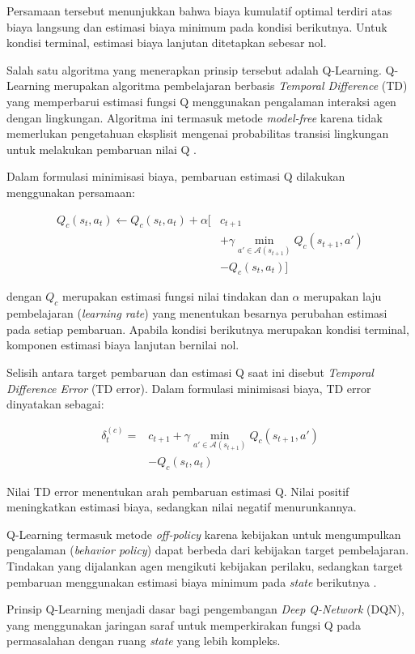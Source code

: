 Persamaan tersebut menunjukkan bahwa biaya kumulatif optimal terdiri atas biaya langsung dan estimasi biaya minimum pada kondisi berikutnya. Untuk kondisi terminal, estimasi biaya lanjutan ditetapkan sebesar nol.

Salah satu algoritma yang menerapkan prinsip tersebut adalah Q-Learning. Q-Learning merupakan algoritma pembelajaran berbasis \textit{Temporal Difference} (TD) yang memperbarui estimasi fungsi Q menggunakan pengalaman interaksi agen dengan lingkungan. Algoritma ini termasuk metode \textit{model-free} karena tidak memerlukan pengetahuan eksplisit mengenai probabilitas transisi lingkungan untuk melakukan pembaruan nilai Q \cite{watkins1992qlearning,suttonbarto2018}.

Dalam formulasi minimisasi biaya, pembaruan estimasi Q dilakukan menggunakan persamaan:

\begin{equation}
\label{eq:q_learning_cost}
\begin{aligned}
Q_c(s_t,a_t)\leftarrow Q_c(s_t,a_t)
+\alpha\bigg[
&c_{t+1}\\
&+\gamma\min_{a'\in\mathcal{A}(s_{t+1})}
Q_c(s_{t+1},a')\\
&-Q_c(s_t,a_t)
\bigg]
\end{aligned}
\end{equation}

dengan $Q_c$ merupakan estimasi fungsi nilai tindakan dan $\alpha$ merupakan laju pembelajaran (\textit{learning rate}) yang menentukan besarnya perubahan estimasi pada setiap pembaruan. Apabila kondisi berikutnya merupakan kondisi terminal, komponen estimasi biaya lanjutan bernilai nol.

Selisih antara target pembaruan dan estimasi Q saat ini disebut \textit{Temporal Difference Error} (TD error). Dalam formulasi minimisasi biaya, TD error dinyatakan sebagai:

\begin{equation}
\label{eq:td_error_cost}
\begin{aligned}
\delta_t^{(c)}
=
&c_{t+1}
+\gamma\min_{a'\in\mathcal{A}(s_{t+1})}
Q_c(s_{t+1},a')\\
&-Q_c(s_t,a_t)
\end{aligned}
\end{equation}

Nilai TD error menentukan arah pembaruan estimasi Q. Nilai positif meningkatkan estimasi biaya, sedangkan nilai negatif menurunkannya.

Q-Learning termasuk metode \textit{off-policy} karena kebijakan untuk mengumpulkan pengalaman (\textit{behavior policy}) dapat berbeda dari kebijakan target pembelajaran. Tindakan yang dijalankan agen mengikuti kebijakan perilaku, sedangkan target pembaruan menggunakan estimasi biaya minimum pada \textit{state} berikutnya \cite{suttonbarto2018,watkins1992qlearning}.

Prinsip Q-Learning menjadi dasar bagi pengembangan \textit{Deep Q-Network} (DQN), yang menggunakan jaringan saraf untuk memperkirakan fungsi Q pada permasalahan dengan ruang \textit{state} yang lebih kompleks.

